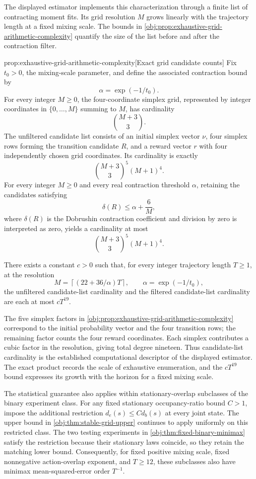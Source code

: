 The displayed estimator implements this characterization through a finite list of contracting moment fits. Its grid resolution \(M\) grows linearly with the trajectory length at a fixed mixing scale. The bounds in \cref{obj:prop:exhaustive-grid-arithmetic-complexity} quantify the size of the list before and after the contraction filter.

\begin{propositionv}{prop:exhaustive-grid-arithmetic-complexity}[Exact grid candidate counts]
Fix \(t_0>0\), the mixing-scale parameter, and define the associated contraction bound by
\[
\alpha=\exp(-1/t_0).
\]
For every integer \(M\ge0\), the four-coordinate simplex grid, represented by integer coordinates in \(\{0,\ldots,M\}\) summing to \(M\), has cardinality
\[
\binom{M+3}{3}.
\]
The unfiltered candidate list consists of an initial simplex vector \(\nu\), four simplex rows forming the transition candidate \(R\), and a reward vector \(r\) with four independently chosen grid coordinates. Its cardinality is exactly
\[
\binom{M+3}{3}^{5}(M+1)^4.
\]
For every integer \(M\ge0\) and every real contraction threshold \(\alpha\), retaining the candidates satisfying
\[
\delta(R)\le \alpha+\frac{6}{M},
\]
where \(\delta(R)\) is the Dobrushin contraction coefficient and division by zero is interpreted as zero, yields a cardinality at most
\[
\binom{M+3}{3}^{5}(M+1)^4.
\]

There exists a constant \(c>0\) such that, for every integer trajectory length \(T\ge1\), at the resolution
\[
M=\left\lceil(22+36/\alpha)T\right\rceil,
\qquad \alpha=\exp(-1/t_0),
\]
the unfiltered candidate-list cardinality and the filtered candidate-list cardinality are each at most \(cT^{19}\).
\end{propositionv}

The five simplex factors in \cref{obj:prop:exhaustive-grid-arithmetic-complexity} correspond to the initial probability vector and the four transition rows; the remaining factor counts the four reward coordinates. Each simplex contributes a cubic factor in the resolution, giving total degree nineteen. Thus candidate-list cardinality is the established computational descriptor of the displayed estimator. The exact product records the scale of exhaustive enumeration, and the \(cT^{19}\) bound expresses its growth with the horizon for a fixed mixing scale.

The statistical guarantee also applies within stationary-overlap subclasses of the binary experiment class. For any fixed stationary occupancy-ratio bound \(C>1\), impose the additional restriction \(d_e(s)\leq C d_b(s)\) at every joint state. The upper bound in \cref{obj:thm:stable-grid-upper} continues to apply uniformly on this restricted class. The two testing experiments in \cref{obj:thm:fixed-binary-minimax} satisfy the restriction because their stationary laws coincide, so they retain the matching lower bound. Consequently, for fixed positive mixing scale, fixed nonnegative action-overlap exponent, and \(T\geq12\), these subclasses also have minimax mean-squared-error order \(T^{-1}\).

